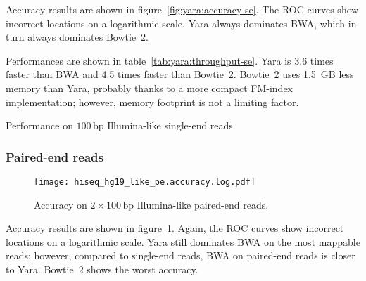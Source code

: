 Accuracy results are shown in figure~\ref{fig:yara:accuracy-se}.
The ROC curves show incorrect locations on a logarithmic scale.
Yara always dominates BWA, which in turn always dominates Bowtie~2.

Performances are shown in table~\ref{tab:yara:throughput-se}.
Yara is 3.6 times faster than BWA and 4.5 times faster than Bowtie~2.
Bowtie~2 uses 1.5~GB less memory than Yara, probably thanks to a more compact FM-index implementation; however, memory footprint is not a limiting factor.

\begin{table}[b]
\begin{center}
\caption[Yara performance on Illumina-like single-end reads]{Performance on $100\,\text{bp}$ Illumina-like single-end reads.}
\sffamily

\label{tab:yara:throughput-se}
\end{center}
\end{table}

\subsubsection{Paired-end reads}

\begin{figure}[t]
\begin{center}
\caption[Yara accuracy on Illumina-like paired-end reads]{Accuracy on $2 \times 100\,\text{bp}$ Illumina-like paired-end reads.}
\label{fig:yara:accuracy-pe}
\texttt{[image: hiseq\_hg19\_like\_pe.accuracy.log.pdf]}
\end{center} 
\end{figure}

Accuracy results are shown in figure~\ref{fig:yara:accuracy-pe}.
Again, the ROC curves show incorrect locations on a logarithmic scale.
Yara still dominates BWA on the most mappable reads; however, compared to single-end reads, BWA on paired-end reads is closer to Yara.
Bowtie~2 shows the worst accuracy. 

